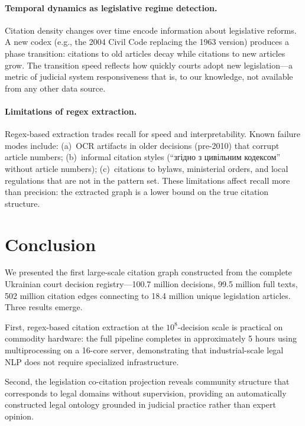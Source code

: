 \documentclass[11pt]{article}
\begin{document}
\paragraph{Temporal dynamics as legislative regime detection.}
Citation density changes over time encode information about legislative reforms.
A new codex (e.g., the 2004 Civil Code replacing the 1963 version) produces a phase transition: citations to old articles decay while citations to new articles grow.
The transition speed reflects how quickly courts adopt new legislation---a metric of judicial system responsiveness that is, to our knowledge, not available from any other data source.

\paragraph{Limitations of regex extraction.}
Regex-based extraction trades recall for speed and interpretability.
Known failure modes include: (a)~OCR artifacts in older decisions (pre-2010) that corrupt article numbers; (b)~informal citation styles (``згідно з цивільним кодексом'' without article numbers); (c)~citations to bylaws, ministerial orders, and local regulations that are not in the pattern set.
These limitations affect recall more than precision: the extracted graph is a lower bound on the true citation structure.


\section{Conclusion}
\label{sec:conclusion}

We presented the first large-scale citation graph constructed from the complete Ukrainian court decision registry---100.7 million decisions, 99.5 million full texts, 502 million citation edges connecting to 18.4 million unique legislation articles.
Three results emerge.

First, regex-based citation extraction at the $10^8$-decision scale is practical on commodity hardware: the full pipeline completes in approximately 5 hours using multiprocessing on a 16-core server, demonstrating that industrial-scale legal NLP does not require specialized infrastructure.

Second, the legislation co-citation projection reveals community structure that corresponds to legal domains without supervision, providing an automatically constructed legal ontology grounded in judicial practice rather than expert opinion.
\end{document}
